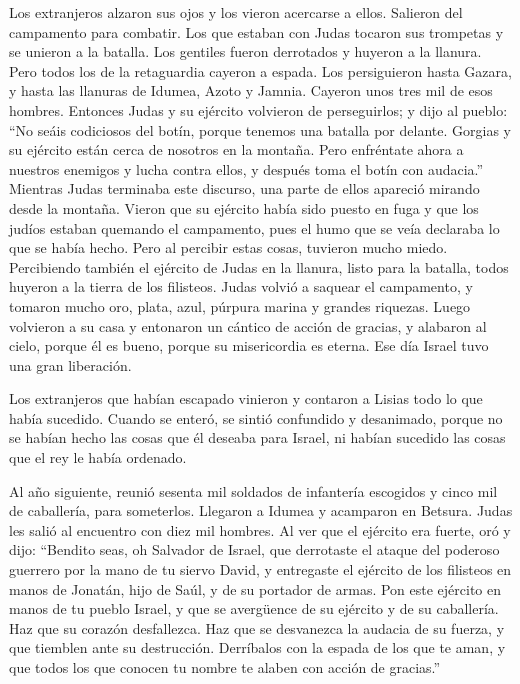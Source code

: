  Los extranjeros alzaron sus ojos y los vieron acercarse
a ellos.  Salieron del campamento para combatir. Los que
estaban con Judas tocaron sus trompetas  y se unieron a
la batalla. Los gentiles fueron derrotados y huyeron a la llanura.
 Pero todos los de la retaguardia cayeron a espada. Los
persiguieron hasta Gazara, y hasta las llanuras de Idumea, Azoto y
Jamnia. Cayeron unos tres mil de esos hombres.  Entonces
Judas y su ejército volvieron de perseguirlos;  y dijo al
pueblo: ``No seáis codiciosos del botín, porque tenemos una batalla por
delante.  Gorgias y su ejército están cerca de nosotros
en la montaña. Pero enfréntate ahora a nuestros enemigos y lucha contra
ellos, y después toma el botín con audacia.''  Mientras
Judas terminaba este discurso, una parte de ellos apareció mirando desde
la montaña.  Vieron que su ejército había sido puesto en
fuga y que los judíos estaban quemando el campamento, pues el humo que
se veía declaraba lo que se había hecho.  Pero al
percibir estas cosas, tuvieron mucho miedo. Percibiendo también el
ejército de Judas en la llanura, listo para la batalla, 
todos huyeron a la tierra de los filisteos.  Judas volvió
a saquear el campamento, y tomaron mucho oro, plata, azul, púrpura
marina y grandes riquezas.  Luego volvieron a su casa y
entonaron un cántico de acción de gracias, y alabaron al cielo, porque
él es bueno, porque su misericordia es eterna.  Ese día
Israel tuvo una gran liberación.

 Los extranjeros que habían escapado vinieron y contaron
a Lisias todo lo que había sucedido.  Cuando se enteró,
se sintió confundido y desanimado, porque no se habían hecho las cosas
que él deseaba para Israel, ni habían sucedido las cosas que el rey le
había ordenado.

 Al año siguiente, reunió sesenta mil soldados de
infantería escogidos y cinco mil de caballería, para someterlos.
 Llegaron a Idumea y acamparon en Betsura. Judas les
salió al encuentro con diez mil hombres.  Al ver que el
ejército era fuerte, oró y dijo: ``Bendito seas, oh Salvador de Israel,
que derrotaste el ataque del poderoso guerrero por la mano de tu siervo
David, y entregaste el ejército de los filisteos en manos de Jonatán,
hijo de Saúl, y de su portador de armas.  Pon este
ejército en manos de tu pueblo Israel, y que se avergüence de su
ejército y de su caballería.  Haz que su corazón
desfallezca. Haz que se desvanezca la audacia de su fuerza, y que
tiemblen ante su destrucción.  Derríbalos con la espada
de los que te aman, y que todos los que conocen tu nombre te alaben con
acción de gracias.''

